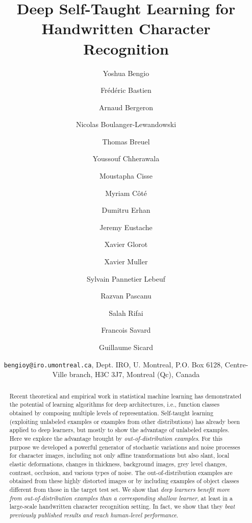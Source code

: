 \documentclass{article} %
\begin{document}
\title{Deep Self-Taught Learning for Handwritten Character Recognition}
\author{
Yoshua  Bengio \and
Frédéric  Bastien \and
Arnaud  Bergeron \and
Nicolas  Boulanger-Lewandowski \and
Thomas  Breuel \and
Youssouf  Chherawala \and
Moustapha  Cisse \and 
Myriam  Côté \and 
Dumitru  Erhan \and
Jeremy  Eustache \and
Xavier  Glorot \and 
Xavier  Muller \and
Sylvain  Pannetier Lebeuf \and
Razvan  Pascanu \and 
Salah  Rifai \and 
Francois  Savard \and 
Guillaume  Sicard 
}
\date{{\tt bengioy@iro.umontreal.ca}, Dept. IRO, U. Montreal, P.O. Box 6128, Centre-Ville branch, H3C 3J7, Montreal (Qc), Canada}

\maketitle


\vspace*{-2mm}
\begin{abstract}
  Recent theoretical and empirical work in statistical machine learning has demonstrated the potential of learning algorithms for deep architectures, i.e., function classes obtained by composing multiple levels of representation. Self-taught learning (exploiting unlabeled examples or examples from other distributions) has already been applied to deep learners, but mostly to show the advantage of unlabeled examples. Here we explore the advantage brought by {\em out-of-distribution examples}.  For this purpose we developed a powerful generator of stochastic variations and noise processes for character images, including not only affine transformations but also slant, local elastic deformations, changes in thickness, background images, grey level changes, contrast, occlusion, and various types of noise. The out-of-distribution examples are obtained from these highly distorted images or by including examples of object classes different from those in the target test set.  We show that {\em deep learners benefit more from out-of-distribution examples than a corresponding shallow learner}, at least in a large-scale handwritten character recognition setting. In fact, we show that they {\em beat previously published results and reach human-level performance}.
\end{abstract}
\vspace*{-3mm}

\end{document}
